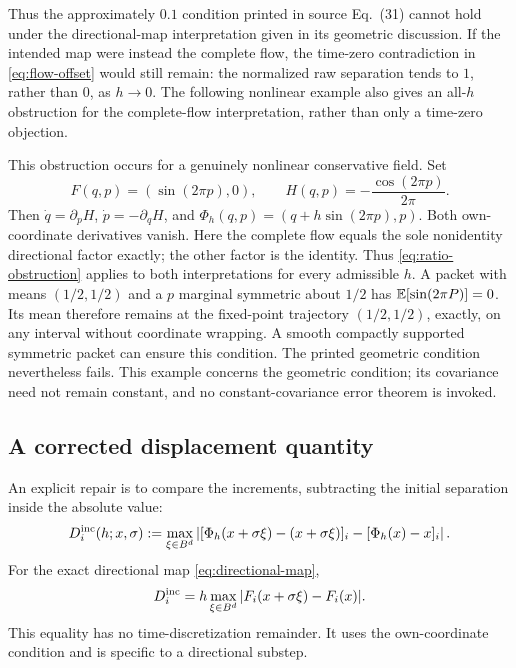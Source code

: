 Thus the approximately $0.1$ condition printed in source Eq.~(31) cannot
hold under the directional-map interpretation given in its geometric
discussion. If the intended map were instead the complete flow, the
time-zero contradiction in \eqref{eq:flow-offset} would still remain:
the normalized raw separation tends to $1$, rather than $0$, as $h\to0$.
The following nonlinear example also gives an all-$h$ obstruction for the
complete-flow interpretation, rather than only a time-zero objection.

This obstruction occurs for a genuinely nonlinear conservative field. Set
\begin{equation}
 F(q,p)=(\sin(2\pi p),0),\qquad
 H(q,p)=-\frac{\cos(2\pi p)}{2\pi}.
 \label{eq:nonlinear-shear}
\end{equation}
Then $\dot q=\partial_pH$, $\dot p=-\partial_qH$, and
$\Phi_h(q,p)=(q+h\sin(2\pi p),p)$. Both own-coordinate derivatives
vanish. Here the complete flow equals the sole nonidentity directional
factor exactly; the other factor is the identity. Thus
\eqref{eq:ratio-obstruction} applies to both interpretations for every
admissible $h$. A packet with means $(1/2,1/2)$ and a $p$ marginal symmetric
about $1/2$ has $\mathbb E\!\left[\sin(2\pi P)\right]=0$. Its mean therefore remains at the
fixed-point trajectory $(1/2,1/2)$, exactly, on any interval without
coordinate wrapping. A smooth compactly supported symmetric packet can
ensure this condition. The printed geometric condition nevertheless fails.
This example concerns the geometric condition; its covariance need not
remain constant, and no constant-covariance error theorem is invoked.

\subsection{A corrected displacement quantity}
An explicit repair is to compare the increments, subtracting the initial
separation inside the absolute value:
\begin{equation}
 D_i^{\rm inc}(h;x,\sigma):=
 \max_{\xi\in B^d}\left|
 [\Phi_h(x+\sigma\xi)-(x+\sigma\xi)]_i
 -[\Phi_h(x)-x]_i\right|.
 \label{eq:increment-distortion}
\end{equation}
For the exact directional map \eqref{eq:directional-map},
\begin{equation}
 D_i^{\rm inc}
 =h\max_{\xi\in B^d}|F_i(x+\sigma\xi)-F_i(x)|.
 \label{eq:increment-exact}
\end{equation}
This equality has no time-discretization remainder. It uses the
own-coordinate condition and is specific to a directional substep.

